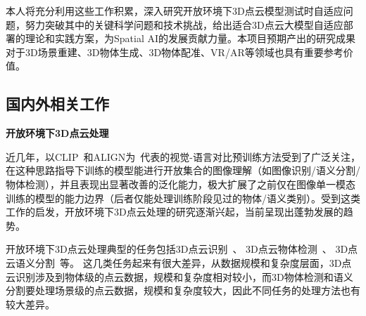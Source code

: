 \documentclass[12pt]{article}
\begin{document}
本人将充分利用这些工作积累，深入研究开放环境下3D点云模型测试时自适应问题，努力突破其中的关键科学问题和技术挑战，给出适合3D点云大模型自适应部署的理论和实践方案，为Spatial AI的发展贡献力量。本项目预期产出的研究成果对于3D场景重建、3D物体生成、3D物体配准、VR/AR等领域也具有重要参考价值。

\subsection{国内外相关工作}

\textbf{开放环境下3D点云处理}

近几年，以CLIP~\cite{radford21clip}和ALIGN为~\cite{jia21scaling}代表的视觉-语言对比预训练方法受到了广泛关注，在这种思路指导下训练的模型能进行开放集合的图像理解（如图像识别/语义分割/物体检测），并且表现出显著改善的泛化能力，极大扩展了之前仅在图像单一模态训练的模型的能力边界（后者仅能处理训练阶段见过的物体/语义类别）。受到这类工作的启发，开放环境下3D点云处理的研究逐渐兴起，当前呈现出蓬勃发展的趋势。

开放环境下3D点云处理典型的任务包括3D点云识别~\cite{zhang22pointclip,zhu23pointclip2,sun25pointcache,sun24point-prc,sun24ppt3d,xue23ulip,xue24ulip2,liu23openshape,zhou24uni3d}、
3D点云物体检测~\cite{zeng23clip2,zhu23pointclip2,lu23ov3det,yang24imov3d,cao23coda,cao25codav2}、
3D点云语义分割~\cite{jiang24ov3d,kolodiazhnyi2024oneformer3d,zhou2025pointsam,rusnak25haec,boudjoghra2025openyolo3d}等。
这几类任务起来有很大差异，从数据规模和复杂度层面，3D点云识别涉及到物体级的点云数据，规模和复杂度相对较小，而3D物体检测和语义分割要处理场景级的点云数据，规模和复杂度较大，因此不同任务的处理方法也有较大差异。
\end{document}
